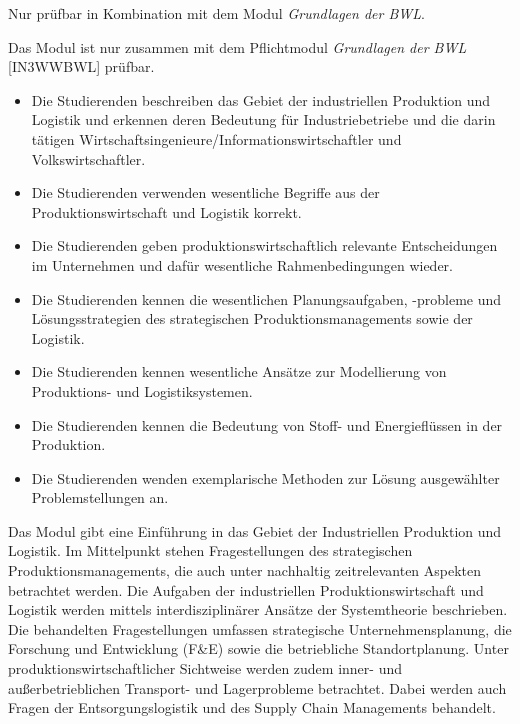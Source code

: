 \begin{module}
\begin{styleenv}
\begin{conditions}Nur prüfbar in Kombination mit dem Modul \emph{Grundlagen der BWL}.

 

Das Modul ist nur zusammen mit dem Pflichtmodul \emph{Grundlagen der BWL} [IN3WWBWL] prüfbar.

\end{conditions}


\end{styleenv}

\begin{learningoutcomes}
\begin{itemize}\item Die Studierenden beschreiben das Gebiet der industriellen Produktion und Logistik und erkennen deren Bedeutung für Industriebetriebe und die darin tätigen Wirtschaftsingenieure/Informationswirtschaftler und Volkswirtschaftler.  \item Die Studierenden verwenden wesentliche Begriffe aus der Produktionswirtschaft und Logistik korrekt.  \item Die Studierenden geben produktionswirtschaftlich relevante Entscheidungen im Unternehmen und dafür wesentliche Rahmenbedingungen wieder.  \item Die Studierenden kennen die wesentlichen Planungsaufgaben, -probleme und Lösungsstrategien des strategischen Produktionsmanagements sowie der Logistik.  \item Die Studierenden kennen wesentliche Ansätze zur Modellierung von Produktions- und Logistiksystemen.  \item Die Studierenden kennen die Bedeutung von Stoff- und Energieflüssen in der Produktion.  \item Die Studierenden wenden exemplarische Methoden zur Lösung ausgewählter Problemstellungen an.  \end{itemize}
\end{learningoutcomes}

\begin{content}
Das Modul gibt eine Einführung in das Gebiet der Industriellen Produktion und Logistik. Im Mittelpunkt stehen Fragestellungen des strategischen Produktionsmanagements, die auch unter nachhaltig zeitrelevanten Aspekten betrachtet werden. Die Aufgaben der industriellen Produktionswirtschaft und Logistik werden mittels interdisziplinärer Ansätze der Systemtheorie beschrieben. Die behandelten Fragestellungen umfassen strategische Unternehmensplanung, die Forschung und Entwicklung (F\&E) sowie die betriebliche Standortplanung. Unter produktionswirtschaftlicher Sichtweise werden zudem inner- und außerbetrieblichen Transport- und Lagerprobleme betrachtet. Dabei werden auch Fragen der Entsorgungslogistik und des Supply Chain Managements behandelt.


\end{content}



\end{module}

